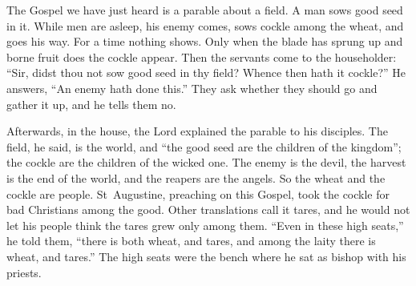 \raggedcolumns

The Gospel we have just heard is a parable about a field. A man sows good
seed in it. While men are asleep, his enemy comes, sows cockle among the
wheat, and goes his way. For a time nothing shows. Only when the blade has
sprung up and borne fruit does the cockle appear. Then the servants come to
the householder: ``Sir, didst thou not sow good seed in thy field? Whence then
hath it cockle?'' He answers, ``An enemy hath done this.'' They ask whether
they should go and gather it up, and he tells them no.

Afterwards, in the house, the Lord explained the parable to his disciples. The
field, he said, is the world, and ``the good seed are the children of the
kingdom''; the cockle are the children of the wicked one. The enemy is the
devil, the harvest is the end of the world, and the reapers are the angels.
So the wheat and the cockle are people. St~Augustine, preaching on this
Gospel, took the cockle for bad Christians among the good. Other translations
call it tares, and he would not let his people think the tares grew only
among them. ``Even in these high seats,'' he told them, ``there is both wheat,
and tares, and among the laity there is wheat, and tares.'' The high seats
were the bench where he sat as bishop with his priests.

